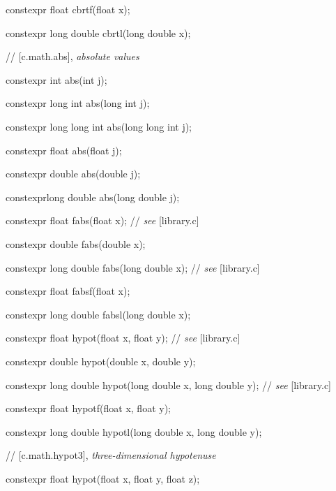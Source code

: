 \documentclass[prd,twocolumn,amsmath,amssymb,nofootinbib,eqsecnum]{revtex4-1}
\newcommand{\highlight}[1]{{\color{green} #1}}
\newcommand{\oldhighlight}[1]{{\color{blue} #1}}
\newcommand{\stdcomment}[1]{{// {\it see} [#1]}}
\begin{document}
{\highlight{constexpr} float cbrtf(float x);

\highlight{constexpr} long double cbrtl(long double x);

\vspace{2ex}

//  [c.math.abs], {\it absolute values}


\oldhighlight{constexpr} int abs(int j);

\oldhighlight{constexpr} long int abs(long int j);

\oldhighlight{constexpr} long long int abs(long long int j);

\oldhighlight{constexpr} float abs(float j);

\oldhighlight{constexpr} double abs(double j);

\oldhighlight{constexpr}long double abs(long double j);

\vspace{2ex}


\oldhighlight{constexpr} float fabs(float x); \stdcomment{library.c}

\oldhighlight{constexpr} double fabs(double x);

\oldhighlight{constexpr} long double fabs(long double x); \stdcomment{library.c}

\oldhighlight{constexpr} float fabsf(float x);

\oldhighlight{constexpr} long double fabsl(long double x);

\vspace{2ex}


\highlight{constexpr} float hypot(float x, float y); \stdcomment{library.c}

\highlight{constexpr} double hypot(double x, double y);

\highlight{constexpr} long double hypot(long double x, long double y); \stdcomment{library.c}

\highlight{constexpr} float hypotf(float x, float y);

\highlight{constexpr} long double hypotl(long double x, long double y);

\vspace{2ex}

// [c.math.hypot3], {\it three-dimensional hypotenuse}


\highlight{constexpr} float hypot(float x, float y, float z);

}
\end{document}
